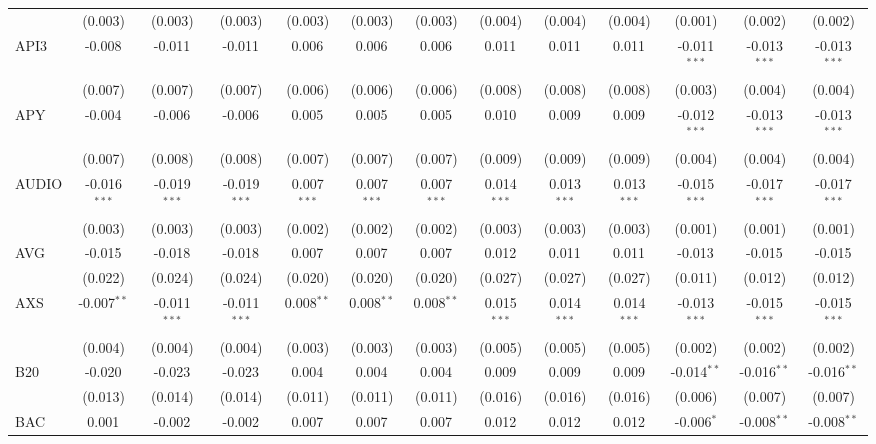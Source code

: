 \begin{table}[!htbp]
\begin{tabular}{@{\extracolsep{5pt}}lcccccccccccc}
  & (0.003) & (0.003) & (0.003) & (0.003) & (0.003) & (0.003) & (0.004) & (0.004) & (0.004) & (0.001) & (0.002) & (0.002) \\
 API3 & -0.008$^{}$ & -0.011$^{}$ & -0.011$^{}$ & 0.006$^{}$ & 0.006$^{}$ & 0.006$^{}$ & 0.011$^{}$ & 0.011$^{}$ & 0.011$^{}$ & -0.011$^{***}$ & -0.013$^{***}$ & -0.013$^{***}$ \\
  & (0.007) & (0.007) & (0.007) & (0.006) & (0.006) & (0.006) & (0.008) & (0.008) & (0.008) & (0.003) & (0.004) & (0.004) \\
 APY & -0.004$^{}$ & -0.006$^{}$ & -0.006$^{}$ & 0.005$^{}$ & 0.005$^{}$ & 0.005$^{}$ & 0.010$^{}$ & 0.009$^{}$ & 0.009$^{}$ & -0.012$^{***}$ & -0.013$^{***}$ & -0.013$^{***}$ \\
  & (0.007) & (0.008) & (0.008) & (0.007) & (0.007) & (0.007) & (0.009) & (0.009) & (0.009) & (0.004) & (0.004) & (0.004) \\
 AUDIO & -0.016$^{***}$ & -0.019$^{***}$ & -0.019$^{***}$ & 0.007$^{***}$ & 0.007$^{***}$ & 0.007$^{***}$ & 0.014$^{***}$ & 0.013$^{***}$ & 0.013$^{***}$ & -0.015$^{***}$ & -0.017$^{***}$ & -0.017$^{***}$ \\
  & (0.003) & (0.003) & (0.003) & (0.002) & (0.002) & (0.002) & (0.003) & (0.003) & (0.003) & (0.001) & (0.001) & (0.001) \\
 AVG & -0.015$^{}$ & -0.018$^{}$ & -0.018$^{}$ & 0.007$^{}$ & 0.007$^{}$ & 0.007$^{}$ & 0.012$^{}$ & 0.011$^{}$ & 0.011$^{}$ & -0.013$^{}$ & -0.015$^{}$ & -0.015$^{}$ \\
  & (0.022) & (0.024) & (0.024) & (0.020) & (0.020) & (0.020) & (0.027) & (0.027) & (0.027) & (0.011) & (0.012) & (0.012) \\
 AXS & -0.007$^{**}$ & -0.011$^{***}$ & -0.011$^{***}$ & 0.008$^{**}$ & 0.008$^{**}$ & 0.008$^{**}$ & 0.015$^{***}$ & 0.014$^{***}$ & 0.014$^{***}$ & -0.013$^{***}$ & -0.015$^{***}$ & -0.015$^{***}$ \\
  & (0.004) & (0.004) & (0.004) & (0.003) & (0.003) & (0.003) & (0.005) & (0.005) & (0.005) & (0.002) & (0.002) & (0.002) \\
 B20 & -0.020$^{}$ & -0.023$^{}$ & -0.023$^{}$ & 0.004$^{}$ & 0.004$^{}$ & 0.004$^{}$ & 0.009$^{}$ & 0.009$^{}$ & 0.009$^{}$ & -0.014$^{**}$ & -0.016$^{**}$ & -0.016$^{**}$ \\
  & (0.013) & (0.014) & (0.014) & (0.011) & (0.011) & (0.011) & (0.016) & (0.016) & (0.016) & (0.006) & (0.007) & (0.007) \\
 BAC & 0.001$^{}$ & -0.002$^{}$ & -0.002$^{}$ & 0.007$^{}$ & 0.007$^{}$ & 0.007$^{}$ & 0.012$^{}$ & 0.012$^{}$ & 0.012$^{}$ & -0.006$^{*}$ & -0.008$^{**}$ & -0.008$^{**}$ \\

\end{tabular}
\end{table}
